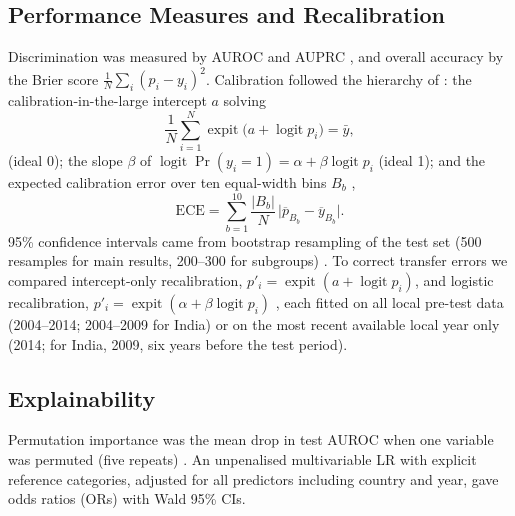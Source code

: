 \documentclass[conference]{IEEEtran}
\DeclareMathOperator{\logit}{logit}
\DeclareMathOperator{\expit}{expit}
\begin{document}
\subsection{Performance Measures and Recalibration}\label{sec:measures}
Discrimination was measured by AUROC and AUPRC \cite{saito2015}, and overall accuracy by the Brier score $\frac{1}{N}\sum_i(p_i-y_i)^2$. Calibration followed the hierarchy of \cite{vancalster2016}: the calibration-in-the-large intercept $a$ solving
\begin{equation}
\frac{1}{N}\sum_{i=1}^{N}\expit\big(a+\logit p_i\big)=\bar{y},
\label{eq:citl}
\end{equation}
(ideal 0); the slope $\beta$ of $\logit\Pr(y_i{=}1)=\alpha+\beta\logit p_i$ (ideal 1); and the expected calibration error over ten equal-width bins $B_b$ \cite{guo2017},
\begin{equation}
\mathrm{ECE}=\sum_{b=1}^{10}\frac{|B_b|}{N}\,\Big|\overline{p}_{B_b}-\overline{y}_{B_b}\Big|.
\label{eq:ece}
\end{equation}
95\% confidence intervals came from bootstrap resampling of the test set (500 resamples for main results, 200--300 for subgroups) \cite{efron1993}. To correct transfer errors we compared intercept-only recalibration, $p'_i=\expit(a+\logit p_i)$, and logistic recalibration, $p'_i=\expit(\alpha+\beta\logit p_i)$ \cite{janssen2008,steyerberg2019}, each fitted on all local pre-test data (2004--2014; 2004--2009 for India) or on the most recent available local year only (2014; for India, 2009, six years before the test period).

\subsection{Explainability}\label{sec:explain}
Permutation importance was the mean drop in test AUROC when one variable was permuted (five repeats) \cite{breiman2001,fisher2019}. An unpenalised multivariable LR with explicit reference categories, adjusted for all predictors including country and year, gave odds ratios (ORs) with Wald 95\% CIs.
\end{document}
